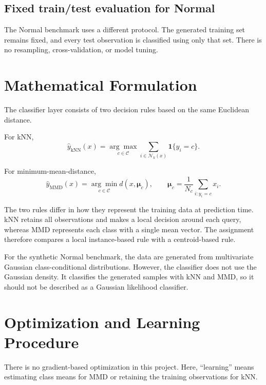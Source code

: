 \documentclass[11pt,a4paper]{article}
\begin{document}
\subsection{Fixed train/test evaluation for Normal}

The Normal benchmark uses a different protocol. The generated training set remains fixed, and every test observation is classified using only that set. There is no resampling, cross-validation, or model tuning.

\section{Mathematical Formulation}

The classifier layer consists of two decision rules based on the same Euclidean distance.

For kNN,
\begin{equation}
 \hat{y}_{\mathrm{kNN}}(x)
 =
 \underset{c\in\mathcal{C}}{\arg\max}
 \sum_{i\in\mathcal{N}_k(x)}
 \mathbf{1}\{y_i=c\}.
\end{equation}

For minimum-mean-distance,
\begin{equation}
 \hat{y}_{\mathrm{MMD}}(x)
 =
 \underset{c\in\mathcal{C}}{\arg\min}
 d(x,\boldsymbol{\mu}_c),
 \qquad
 \boldsymbol{\mu}_c
 =
 \frac{1}{N_c}
 \sum_{i:y_i=c}x_i.
\end{equation}

The two rules differ in how they represent the training data at prediction time. kNN retains all observations and makes a local decision around each query, whereas MMD represents each class with a single mean vector. The assignment therefore compares a local instance-based rule with a centroid-based rule.

For the synthetic Normal benchmark, the data are generated from multivariate Gaussian class-conditional distributions. However, the classifier does not use the Gaussian density. It classifies the generated samples with kNN and MMD, so it should not be described as a Gaussian likelihood classifier.

\section{Optimization and Learning Procedure}

There is no gradient-based optimization in this project. Here, ``learning'' means estimating class means for MMD or retaining the training observations for kNN.
\end{document}
